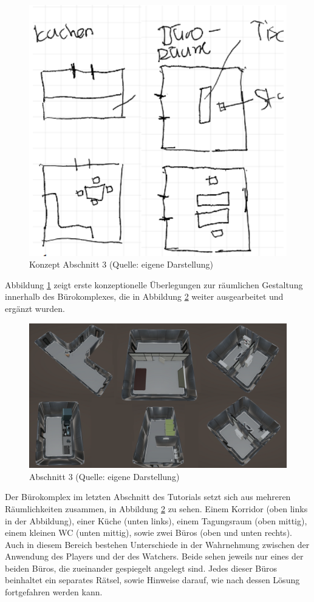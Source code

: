\begin{figure}[ht]
\centering
\includegraphics[width=0.6\linewidth]{content/pictures/Abschnitt_02_Concept.png}
\caption{Konzept Abschnitt 3 (Quelle: eigene Darstellung)}
\label{fig:section_02_concept}
\end{figure}

Abbildung \ref{fig:section_02_concept} zeigt erste konzeptionelle Überlegungen zur räumlichen Gestaltung innerhalb des Bürokomplexes, die in Abbildung \ref{fig:section_02} weiter ausgearbeitet und ergänzt wurden.

\begin{figure}[ht]
\centering
\includegraphics[width=1\linewidth]{content/pictures/Abschnitt_02.png}
\caption{Abschnitt 3 (Quelle: eigene Darstellung)}
\label{fig:section_02}
\end{figure}

Der Bürokomplex im letzten Abschnitt des Tutorials setzt sich aus mehreren Räumlichkeiten zusammen, in Abbildung \ref{fig:section_02} zu sehen. Einem Korridor (oben links in der Abbildung), einer Küche (unten links), einem Tagungsraum (oben mittig), einem kleinen WC (unten mittig), sowie zwei Büros (oben und unten rechts). Auch in diesem Bereich bestehen Unterschiede in der Wahrnehmung zwischen der Anwendung des Players und der des Watchers. Beide sehen jeweils nur eines der beiden Büros, die zueinander gespiegelt angelegt sind. Jedes dieser Büros beinhaltet ein separates Rätsel, sowie Hinweise darauf, wie nach dessen Lösung fortgefahren werden kann.

